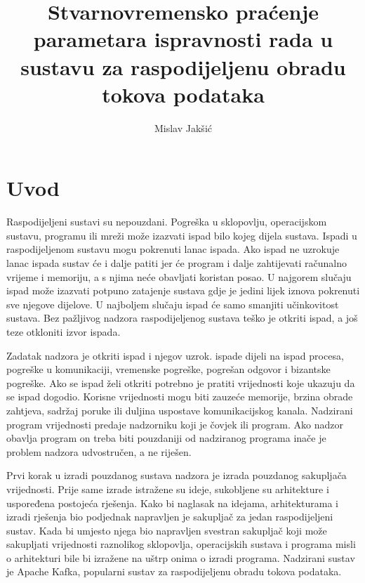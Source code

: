 \documentclass[times, utf8, diplomski, numeric]{fer}
\begin{document}

\title{Stvarnovremensko praćenje parametara ispravnosti rada u sustavu za raspodijeljenu obradu tokova podataka}

\author{Mislav Jakšić}

\maketitle

\izvornik


\tableofcontents

\chapter{Uvod}

Raspodijeljeni sustavi su nepouzdani. Pogreška u sklopovlju, operacijskom sustavu, programu ili mreži može izazvati ispad bilo kojeg dijela sustava. Ispadi u raspodijeljenom sustavu mogu pokrenuti lanac ispada. Ako ispad ne uzrokuje lanac ispada sustav će i dalje patiti jer će program i dalje zahtijevati računalno vrijeme i memoriju, a s njima neće obavljati koristan posao. U najgorem slučaju ispad može izazvati potpuno zatajenje sustava gdje je jedini lijek iznova pokrenuti sve njegove dijelove. U najboljem slučaju ispad će samo smanjiti učinkovitost sustava. Bez pažljivog nadzora raspodijeljenog sustava teško je otkriti ispad, a još teze otkloniti izvor ispada.

Zadatak nadzora je otkriti ispad i njegov uzrok. \citep{rassus-manual} ispade dijeli na ispad procesa, pogreške u komunikaciji, vremenske pogreške, pogrešan odgovor i bizantske pogreške. Ako se ispad želi otkriti potrebno je pratiti vrijednosti koje ukazuju da se ispad dogodio. Korisne vrijednosti mogu biti zauzeće memorije, brzina obrade zahtjeva, sadržaj poruke ili duljina uspostave komunikacijskog kanala. Nadzirani program vrijednosti predaje nadzorniku koji je čovjek ili program. Ako nadzor obavlja program on treba biti pouzdaniji od nadziranog programa inače je problem nadzora udvostručen, a ne riješen.

Prvi korak u izradi pouzdanog sustava nadzora je izrada pouzdanog sakupljača vrijednosti. Prije same izrade istražene su ideje, sukobljene su arhitekture i uspoređena postojeća rješenja. Kako bi naglasak na idejama, arhitekturama i izradi rješenja bio podjednak napravljen je sakupljač za jedan raspodijeljeni sustav. Kada bi umjesto njega bio napravljen svestran sakupljač koji može sakupljati vrijednosti raznolikog sklopovlja, operacijskih sustava i programa misli o arhitekturi bile bi izražene na uštrp onima o izradi programa. Nadzirani sustav je Apache Kafka, popularni sustav za raspodijeljenu obradu tokova podataka.
\end{document}
